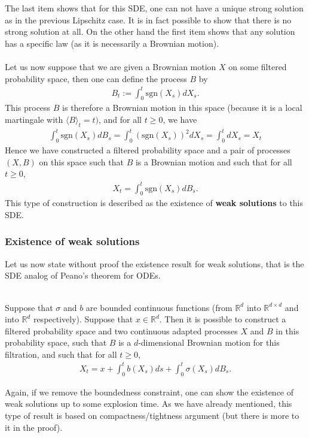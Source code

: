 \documentclass[../mainfile.tex]{subfiles}
\begin{document}
\newpage
The last item shows that for this SDE, one can not have a unique strong solution as in the previous Lipschitz case. It is in fact possible to show that there is no strong solution at all. On the other hand the first item shows that any solution has a specific law (as it is necessarily a Brownian motion). \\
\\
Let us now suppose that we are given a Brownian motion $X$ on some filtered probability space, then one can define the process $B$ by 
\begin{align*}
B_t:= \int_0^t \text{sgn}(X_s)dX_s.
\end{align*}
This process $B$ is therefore a Brownian motion in this space (because it is a local martingale with $\langle B \rangle_t=t)$, and for all $t \geq 0$, we have 
\begin{align*}
\int_0^t \text{sgn}(X_s)dB_s = \int_0^t ( \text{sgn}(X_s))^2 dX_s = \int_0^t dX_s=X_t
\end{align*}
Hence we have constructed a filtered probability space and a pair of processes $(X,B)$ on this space such that $B$ is a Brownian motion and such that for all $t \geq 0$, 
\begin{align*}
X_t= \int_0^t \text{sgn}(X_s)dB_s.
\end{align*}
This type of construction is described as the existence of \textbf{weak solutions} to this SDE.
\subsubsection{Existence of weak solutions}
Let us now state without proof the existence result for weak solutions, that is the SDE analog of Peano's theorem for ODEs. 
\begin{thm} \ \\ Suppose that $\sigma$ and $b$ are bounded continuous functions (from $\mathbb{R}^d$ into $\mathbb{R}^{d \times d}$ and into $\mathbb{R}^d$ respectively). Suppose that $x \in \mathbb{R}^d$. Then it is possible to construct a filtered probability space and two continuous adapted processes $X$ and $B$ in this probability space, such that $B$ is a $d$-dimensional Brownian motion for this filtration, and such that for all $t \geq 0$, 
\begin{align*}
X_t = x + \int_0^t b(X_s)ds + \int_0^t \sigma(X_s)dB_s. 
\end{align*}
\end{thm}
\begin{rem} Again, if we remove the boundedness constraint, one can show the existence of weak solutions up to some explosion time. As we have already mentioned,  this type of result is based on compactness/tightness argument (but there is more to it in the proof). 
\end{rem}
\newpage
\end{document}
